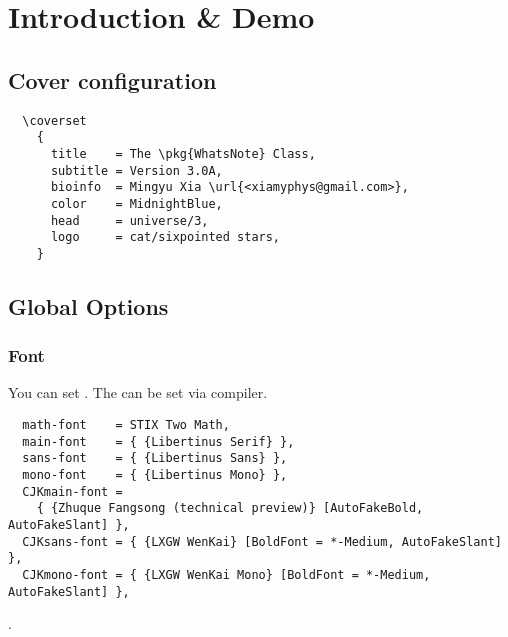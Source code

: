 \documentclass[twoside]{whatsnote}
\providecommand\pkg{\textsf}
\providecommand\url{\texttt}
\begin{document}
\maketitle

\chapter { Introduction \& Demo }

\section{Cover configuration}

\begin{framed}
  \begin{verbatim}
  \coverset
    {
      title    = The \pkg{WhatsNote} Class,
      subtitle = Version 3.0A,
      bioinfo  = Mingyu Xia \url{<xiamyphys@gmail.com>},
      color    = MidnightBlue,
      head     = universe/3,
      logo     = cat/sixpointed stars,
    }
  \end{verbatim}
\end{framed}

\section{Global Options}

\subsection{Font}

You can set   
 .
The  can be set via  compiler.

\begin{framed}
\begin{verbatim}
  math-font    = STIX Two Math,
  main-font    = { {Libertinus Serif} },
  sans-font    = { {Libertinus Sans} },
  mono-font    = { {Libertinus Mono} },
  CJKmain-font =
    { {Zhuque Fangsong (technical preview)} [AutoFakeBold, AutoFakeSlant] },
  CJKsans-font = { {LXGW WenKai} [BoldFont = *-Medium, AutoFakeSlant] },
  CJKmono-font = { {LXGW WenKai Mono} [BoldFont = *-Medium, AutoFakeSlant] },
\end{verbatim}
\end{framed}

\scratch
\begin{solution}
  \lipsum [ 2 ]
  .
\end{solution}
\end{document}

